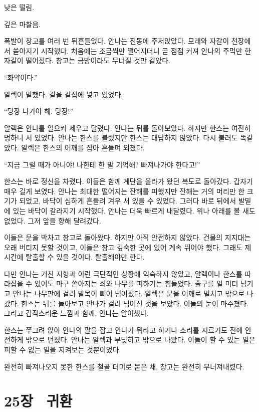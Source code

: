 낮은 떨림.

깊은 마찰음.

폭발이 창고를 여러 번 뒤흔들었다. 안나는 진동에 주저앉았다. 모래와 자갈이 천장에서 쏟아지기 시작했다. 처음에는 조금씩만 떨어지더니 곧 점점 커져 안나의 주먹만 한 자갈이 떨어졌다. 창고는 금방이라도 무너질 것만 같았다.

``화약이다.''

알렉이 말했다. 칼을 칼집에 넣고 있었다.

``당장 나가야 해. 당장!''

알렉은 안나를 일으켜 세우고 달렸다. 안나는 뒤를 돌아보았다. 하지만 한스는 여전히 멍하니 서 있었다. 안나는 한스를 불렀지만 한스는 대답하지 않았다. 다시 불러도 똑같았다. 알렉은 한스의 어깨를 잡아 흔들며 외쳤다.

``지금 그럴 때가 아니야! 나한테 한 말 기억해? 빠져나가야 한다고!''

한스는 바로 정신을 차렸다. 이들은 함께 계단을 올라가 왔던 복도로 돌아갔다. 갑자기 매우 길게 보였다. 안나는 최대한 떨어지는 잔해를 피했지만 잔해는 거의 머리만 한 크기가 되었고, 바닥이 심하게 흔들려 겨우 서 있을 수 있었다. 그러다 바로 뒤에서 발밑에 있는 바닥이 갈라지기 시작했다. 안나는 더욱 빠르게 내달렸다. 위나 아래를 볼 새도 없었다. 그저 앞을 향해 달려갔다.

이들은 문을 박차고 창고로 돌아왔다. 하지만 아직 안전하지 않았다. 건물의 지지대는 오래 버티지 못할 것이고, 이들은 창고 깊숙한 곳에 있어 계속 뛰어야 했다. 그래도 제시간에 탈출할 수 있을 것이다. 탈출해야만 한다.

다만 안나는 거친 지형과 이런 극단적인 상황에 익숙하지 않았고, 알렉이나 한스를 따라잡을 수 있어도 마구 쏟아지는 쇠와 나무를 피하기는 힘들었다. 출구를 일 미터 남기고 안나는 나무판에 걸려 발목이 삐어 넘어졌다. 알렉은 문을 어깨로 밀치고 밖으로 나갔다. 한스는 뒤를 돌아보고 안나가 걸려 넘어진 것을 보았다. 이들의 눈이 마주쳤다. 그리고 갑작스러운 느낌과 함께, 안나는 알아챘다.

한스는 쭈그려 앉아 안나의 팔을 잡고 안나가 뭐라고 하거나 소리를 지르기도 전에 안전하게 밖으로 던졌다. 안나는 알렉과 부딪히고 밖으로 나왔다. 이들이 할 수 있는 일은 피할 수 없는 일을 지켜보는 것뿐이었다.

완전히 빠져나오지 못한 한스를 철골 더미로 묻은 채, 창고는 완전히 무너져내렸다.



\chapter[25장  귀환][25장\hspace*{.5em}귀환]{25장 \ 귀환}



